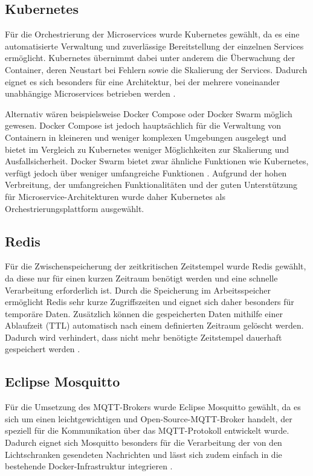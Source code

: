 \subsection{Kubernetes}
Für die Orchestrierung der Microservices wurde Kubernetes gewählt, da es eine automatisierte Verwaltung und zuverlässige Bereitstellung der einzelnen Services ermöglicht. Kubernetes übernimmt dabei unter anderem die Überwachung der Container, deren Neustart bei Fehlern sowie die Skalierung der Services. Dadurch eignet es sich besonders für eine Architektur, bei der mehrere voneinander unabhängige Microservices betrieben werden \cite{kubernetes_overview}.

Alternativ wären beispielsweise Docker Compose oder Docker Swarm möglich gewesen. Docker Compose ist jedoch hauptsächlich für die Verwaltung von Containern in kleineren und weniger komplexen Umgebungen ausgelegt und bietet im Vergleich zu Kubernetes weniger Möglichkeiten zur Skalierung und Ausfallsicherheit. Docker Swarm bietet zwar ähnliche Funktionen wie Kubernetes, verfügt jedoch über weniger umfangreiche Funktionen \cite{docker_swarm_vs_kubernetes}. Aufgrund der hohen Verbreitung, der umfangreichen Funktionalitäten und der guten Unterstützung für Microservice-Architekturen wurde daher Kubernetes als Orchestrierungsplattform ausgewählt.

\subsection{Redis}
Für die Zwischenspeicherung der zeitkritischen Zeitstempel wurde Redis gewählt, da diese nur für einen kurzen Zeitraum benötigt werden und eine schnelle Verarbeitung erforderlich ist. Durch die Speicherung im Arbeitsspeicher ermöglicht Redis sehr kurze Zugriffszeiten und eignet sich daher besonders für temporäre Daten. Zusätzlich können die gespeicherten Daten mithilfe einer Ablaufzeit (TTL) automatisch nach einem definierten Zeitraum gelöscht werden. Dadurch wird verhindert, dass nicht mehr benötigte Zeitstempel dauerhaft gespeichert werden \cite{redis_key_expiration}.

\subsection{Eclipse Mosquitto}
Für die Umsetzung des MQTT-Brokers wurde Eclipse Mosquitto gewählt, da es sich um einen leichtgewichtigen und Open-Source-MQTT-Broker handelt, der speziell für die Kommunikation über das MQTT-Protokoll entwickelt wurde. Dadurch eignet sich Mosquitto besonders für die Verarbeitung der von den Lichtschranken gesendeten Nachrichten und lässt sich zudem einfach in die bestehende Docker-Infrastruktur integrieren \cite{eclipse_mosquitto}.

